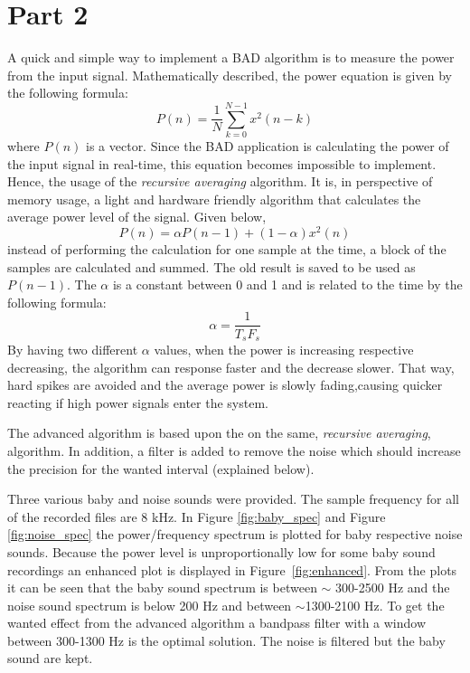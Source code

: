 \section{Part 2}
A quick and simple way to implement a BAD algorithm is to measure the power from the input signal.
Mathematically described, the power equation is given by the following formula: 
\[
P(n) = \frac{1}{N} \sum\limits_{k=0}^{N-1} x^2(n-k)
\]
where $P(n)$ is a vector. Since the BAD application is calculating the power of the input signal in 
real-time, this equation becomes impossible to implement. Hence, the usage of the \emph{recursive
averaging} algorithm. It is, in perspective of memory usage, a light and hardware friendly algorithm 
that calculates the average power level of the signal. Given below,
\[
P(n) = \alpha P(n-1)+(1-\alpha)x^2(n)
\]
instead of performing the calculation for one sample at the time, a block of the samples are calculated and summed.
The old result is saved to be used as $P(n-1)$. The $\alpha$ is a constant between 0 and 1 and is related to the 
time by the following formula:
\[
\alpha = \frac{1}{T_{s}F_{s}}
\]
By having two different $\alpha$ values, when the power is increasing respective decreasing, the algorithm
can response faster and the decrease slower. That way, hard spikes are avoided and the average power is slowly
fading,causing quicker reacting if high power signals enter the system.

The advanced algorithm is based upon the on the same, \emph{recursive averaging}, algorithm.
In addition, a filter is added to remove the noise which should increase the precision for the wanted interval (explained below).

Three various baby and noise sounds were provided. The sample frequency for all of the recorded 
files are 8 kHz. In Figure \ref{fig:baby_spec} and Figure \ref{fig:noise_spec} the power/frequency 
spectrum is plotted for baby respective noise sounds. Because the power level is unproportionally 
low for some baby sound recordings an enhanced plot is displayed in Figure~\ref{fig:enhanced}. 
From the plots it can be seen that the baby sound spectrum is between $\sim$ 300-2500 Hz and the 
noise sound spectrum is below 200 Hz and between $\sim$1300-2100 Hz. To get the wanted effect from 
the advanced algorithm a bandpass filter with a window between 300-1300 Hz is the optimal solution. 
The noise is filtered but the baby sound are kept.

